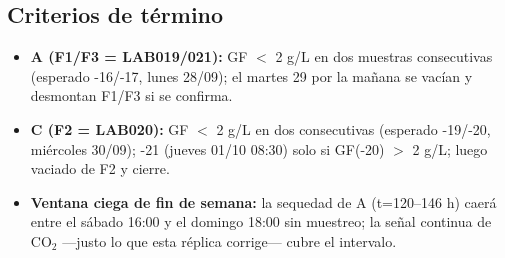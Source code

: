 \documentclass[10pt,landscape]{article}
\begin{document}
\subsection*{Criterios de término}
\begin{itemize}\setlength{\itemsep}{1pt}
\item \textbf{A (F1/F3 = LAB019/021):} GF $<$ 2 g/L en dos muestras consecutivas (esperado -16/-17, lunes 28/09); el martes 29 por la mañana se vacían y desmontan F1/F3 si se confirma.
\item \textbf{C (F2 = LAB020):} GF $<$ 2 g/L en dos consecutivas (esperado -19/-20, miércoles 30/09); -21 (jueves 01/10 08:30) solo si GF(-20) $>$ 2 g/L; luego vaciado de F2 y cierre.
\item \textbf{Ventana ciega de fin de semana:} la sequedad de A (t=120--146 h) caerá entre el sábado 16:00 y el domingo 18:00 sin muestreo; la señal continua de CO$_2$ ---justo lo que esta réplica corrige--- cubre el intervalo.
\end{itemize}
\end{document}
